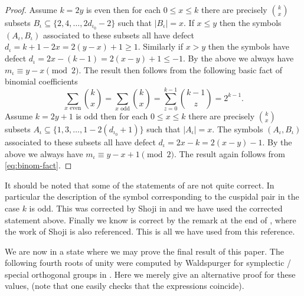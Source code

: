 \documentclass{jt-calcs}
\begin{document}
\begin{proof}
Assume $k=2y$ is even then for each $0 \leqslant x \leqslant k$ there are precisely $\binom{k}{x}$ subsets $B_{\iota} \subseteq \{2,4,\dots,2d_{\iota_0}-2\}$ such that $|B_{\iota}| = x$. If $x \leqslant y$ then the symbols $(A_{\iota},B_{\iota})$ associated to these subsets all have defect $d_{\iota} = k+1 - 2x = 2(y-x) + 1 \geqslant 1$. Similarly if $x > y$ then the symbols have defect $d_{\iota} = 2x - (k-1) = 2(x-y) + 1 \leqslant -1$. By the above we always have $m_{\iota} \equiv y-x \pmod{2}$. The result then follows from the following basic fact of binomial coefficients
\begin{equation}\label{eq:binom-fact}
\sum_{x\text{ even}}\binom{k}{x} = \sum_{x\text{ odd}}\binom{k}{x} = \sum_{z = 0}^{k-1} \binom{k-1}{z} = 2^{k-1}.
\end{equation}
Assume $k = 2y + 1$ is odd then for each $0 \leqslant x \leqslant k$ there are precisely $\binom{k}{x}$ subsets $A_{\iota} \subseteq \{1,3,\dots,1-2(d_{\iota_0}+1)\}$ such that $|A_{\iota}| = x$. The symbols $(A_{\iota},B_{\iota})$ associated to these subsets all have defect $d_{\iota} = 2x-k = 2(x-y) -1$. By the above we always have $m_{\iota} \equiv y-x+1 \pmod{2}$. The result again follows from \eqref{eq:binom-fact}.
\end{proof}

\begin{rem}
It should be noted that some of the statements of \cite[Corollary 12.4]{lusztig:1984:intersection-cohomology-complexes} are not quite correct. In particular the description of the symbol corresponding to the cuspidal pair in the case $k$ is odd. This was corrected by Shoji in \cite[Remark 5.8]{shoji:1997:unipotent-characters-of-finite-classical-groups} and we have used the corrected statement above. Finally we know \cite[Corollary 12.4(c)]{lusztig:1984:intersection-cohomology-complexes} is correct by the remark at the end of \cite[\S 2.B]{geck-malle:2000:existence-of-a-unipotent-support}, where the work of Shoji is also referenced. This is all we have used from this reference.
\end{rem}

We are now in a state where we may prove the final result of this paper. The following fourth roots of unity were computed by Waldspurger for symplectic / special orthogonal groups in \cite[\S V.8 - Proposition]{waldspurger:2001:integrales-orbitales-nilpotentes}. Here we merely give an alternative proof for these values, (note that one easily checks that the expressions coincide).
\end{document}
